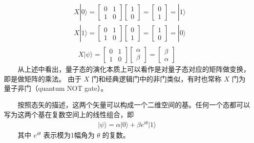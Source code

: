 \documentclass[a4paper,11pt,english]{sphinxmanual}
\begin{document}
\begin{equation*}
\begin{split}\begin{aligned} &X|0\rangle=\left[\begin{array}{ll} 0 & 1 \\ 1 & 0 \end{array}\right]\left[\begin{array}{l} 1 \\ 0 \end{array}\right]=\left[\begin{array}{l} 0 \\ 1 \end{array}\right]=|1\rangle \\ &X|1\rangle=\left[\begin{array}{ll} 0 & 1 \\ 1 & 0 \end{array}\right]\left[\begin{array}{l} 0 \\ 1 \end{array}\right]=\left[\begin{array}{l} 1 \\ 0 \end{array}\right]=|0\rangle \end{aligned}\end{split}
\end{equation*}\begin{equation*}
\begin{split}X|\psi\rangle=\left[\begin{array}{ll} 0 & 1 \\ 1 & 0 \end{array}\right]\left[\begin{array}{l} \alpha \\ \beta \end{array}\right]=\left[\begin{array}{c} \beta \\ \alpha \end{array}\right]\end{split}
\end{equation*}
\sphinxAtStartPar
  从上述中看出，量子态的演化本质上可以看作是对量子态对应的矩阵做变换，即是做矩阵的乘法。 由于 \(X\) 门和经典逻辑门中的非门类似，有时也常称 \(X\) 门为量子非门（quantum NOT gate）。

\sphinxAtStartPar
{}

\sphinxAtStartPar
  按照态矢的描述，这两个矢量可以构成一个二维空间的基。任何一个态都可以写为这两个基在复数空间上的线性组合，即
\begin{equation*}
\begin{split}|\psi\rangle=\alpha|0\rangle+\beta e^{i {\theta}}|1\rangle\end{split}
\end{equation*}
\sphinxAtStartPar
  其中  \(e^{i \theta}\) 表示模为1幅角为  \(\theta\) 的复数。
\end{document}
